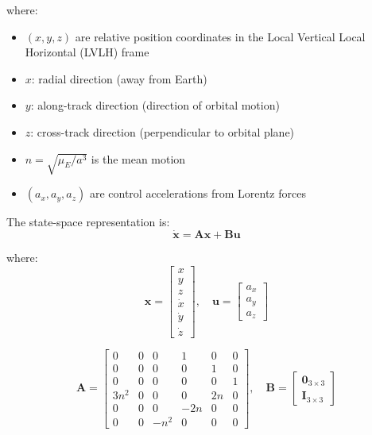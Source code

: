 \documentclass[12pt,a4paper]{article}
\begin{document}
where:
\begin{itemize}
\item $(x, y, z)$ are relative position coordinates in the Local Vertical Local Horizontal (LVLH) frame
\item $x$: radial direction (away from Earth)
\item $y$: along-track direction (direction of orbital motion)
\item $z$: cross-track direction (perpendicular to orbital plane)
\item $n = \sqrt{\mu_E/a^3}$ is the mean motion
\item $(a_x, a_y, a_z)$ are control accelerations from Lorentz forces
\end{itemize}

The state-space representation is:
\begin{equation}
\dot{\mathbf{x}} = \mathbf{A}\mathbf{x} + \mathbf{B}\mathbf{u}
\label{eq:state_space}
\end{equation}

where:
\begin{equation}
\mathbf{x} = \begin{bmatrix} x \\ y \\ z \\ \dot{x} \\ \dot{y} \\ \dot{z} \end{bmatrix}, \quad
\mathbf{u} = \begin{bmatrix} a_x \\ a_y \\ a_z \end{bmatrix}
\label{eq:state_control}
\end{equation}

\begin{equation}
\mathbf{A} = \begin{bmatrix}
0 & 0 & 0 & 1 & 0 & 0 \\
0 & 0 & 0 & 0 & 1 & 0 \\
0 & 0 & 0 & 0 & 0 & 1 \\
3n^2 & 0 & 0 & 0 & 2n & 0 \\
0 & 0 & 0 & -2n & 0 & 0 \\
0 & 0 & -n^2 & 0 & 0 & 0
\end{bmatrix}, \quad
\mathbf{B} = \begin{bmatrix}
\mathbf{0}_{3\times 3} \\
\mathbf{I}_{3\times 3}
\end{bmatrix}
\label{eq:system_matrices}
\end{equation}
\end{document}

